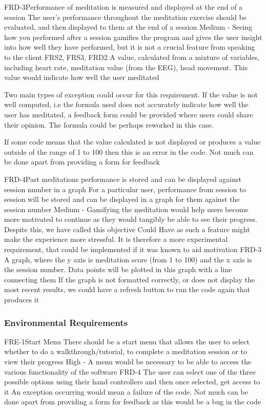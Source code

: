 \documentclass[coverpage,lineno]{../custom}
\begin{document}
\FunctionalReq
{FRD-3}{Performance of meditation is measured and displayed at the end of a session}
{The user's performance throughout the meditation exercise should be evaluated, and then displayed to them at the end of a session}
{Medium - \couldhave}
{Seeing how you performed after a session gamifies the program and gives the user insight into how well they have performed, but it is not a crucial feature from speaking to the client}
{FRS2, FRS3, FRD2}
{A value, calculated from a mixture of variables, including heart rate, meditation value (from the EEG), head movement. This value would indicate how well the user meditated}
{Two main types of exception could occur for this requirement. If the value is not well computed, i.e the formula used does not accurately indicate how well the user has meditated, a feedback form could be provided where users could share their opinion. The formula could be perhaps reworked in this case.

If some code means that the value calculated is not displayed or produces a value outside of the range of 1 to 100 then this is an error in the code. Not much can be done apart from providing a form for feedback}

\FunctionalReq
{FRD-4}{Past meditations performance is stored and can be displayed against session number in a graph}
{For a particular user, performance from session to session will be stored and can be displayed in a graph for them against the session number}
{Medium - \couldhave}
{Gamifying the meditation would help users become more motivated to continue as they would  tangibly be able to see their progress. Despite this, we have called this objective Could Have as such a feature might make the experience more stressful. It is therefore a more experimental requirement, that could be implemented if it was known to aid motivation}
{FRD-3}
{A graph, where the y axis is meditation score (from 1 to 100) and the x axis is the session number. Data points will be plotted in this graph with a line connecting them}
{If the graph is not formatted correctly, or does not display the most recent results, we could have a refresh button to run the code again that produces it}

\subsubsection{Environmental Requirements}

\FunctionalReq
{FRE-1}{Start Menu}
{There should be a start menu that allows the user to select whether to do a walkthrough/tutorial, to complete a meditation session or to view their progress}
{High - \musthave}
{A menu would be necessary to be able to access the various functionality of the software}
{FRD-4}
{The user can select one of the three possible options using their hand controllers and then once selected, get access to it}
{An exception occurring would mean a failure of the code. Not much can be done apart from providing a form for feedback as this would be a bug in the code}
\end{document}
